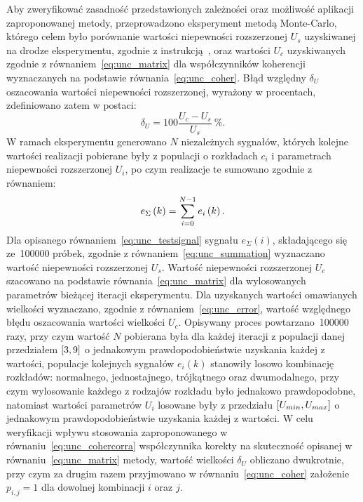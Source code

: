 Aby zweryfikować zasadność przedstawionych zależności oraz możliwość aplikacji zaproponowanej metody, przeprowadzono eksperyment metodą Monte-Carlo, którego celem było porównanie wartości niepewności rozszerzonej $U_{s}$ uzyskiwanej na drodze eksperymentu, zgodnie z instrukcją~\cite{jcgm_montecarlo}, oraz wartości $U_{c}$ uzyskiwanych zgodnie z równaniem~\eqref{eq:unc_matrix} dla współczynników koherencji wyznaczanych na podstawie równania~\eqref{eq:unc_coher}. Błąd względny $\delta_{U}$ oszacowania wartości niepewności rozszerzonej, wyrażony w procentach, zdefiniowano zatem w postaci:
\begin{equation}
\delta_{U} = 100 \frac{U_{c} - U_{s}}{U_{s}}~\unit{\percent} \label{eq:unc_error}.
\end{equation}
W ramach eksperymentu generowano $N$ niezależnych sygnałów, których kolejne wartości realizacji pobierane były z populacji o rozkładach $c_{i}$ i parametrach niepewności rozszerzonej $U_{i}$, po czym realizacje te sumowano zgodnie z równaniem:
\begin{equation}
e_{\Sigma} \left(k\right) = \sum _{i=0} ^{N-1} e_{i} \left(k\right) \label{eq:unc_testsignal}.
\end{equation}
Dla opisanego równaniem~\eqref{eq:unc_testsignal} sygnału $e_{\Sigma}(i)$, składającego się ze~\num{100000} próbek, zgodnie z równaniem~\eqref{eq:unc_summation} wyznaczano wartość niepewności rozszerzonej $U_{s}$. Wartość niepewności rozszerzonej $U_{c}$ szacowano na podstawie równania~\eqref{eq:unc_matrix} dla wylosowanych parametrów bieżącej iteracji eksperymentu. Dla uzyskanych wartości omawianych wielkości wyznaczano, zgodnie z równaniem~\eqref{eq:unc_error}, wartość względnego błędu oszacowania wartości wielkości $U_{c}$. Opisywany proces powtarzano~\num{100000} razy, przy czym wartość $N$ pobierana była dla każdej iteracji z populacji danej przedziałem $\interval{3}{9}$ o jednakowym prawdopodobieństwie uzyskania każdej z wartości, populacje kolejnych sygnałów $e_{i}(k)$ stanowiły losowo kombinację rozkładów: normalnego, jednostajnego, trójkątnego oraz dwumodalnego, przy czym wylosowanie każdego z rodzajów rozkładu było jednakowo prawdopodobne, natomiast wartości parametrów $U_{i}$ losowane były z przedziału $\interval{U_{min}}{U_{max}}$ o jednakowym prawdopodobieństwie uzyskania każdej z wartości. W celu weryfikacji wpływu stosowania zaproponowanego w równaniu~\eqref{eq:unc_cohercorra} współczynnika korekty na skuteczność opisanej w równaniu~\eqref{eq:unc_matrix} metody, wartość wielkości $\delta_{U}$ obliczano dwukrotnie, przy czym za drugim razem przyjmowano w równaniu~\eqref{eq:unc_coher} założenie $p_{i,j} = 1$ dla dowolnej kombinacji $i$ oraz $j$.

